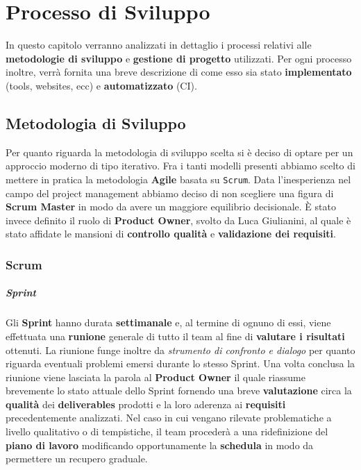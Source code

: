 \chapter{Processo di Sviluppo}
In questo capitolo verranno analizzati in dettaglio i processi relativi alle \textbf{metodologie di sviluppo} e \textbf{gestione di progetto} utilizzati. Per ogni processo inoltre, verrà fornita una breve descrizione di come esso sia stato \textbf{implementato} (tools, websites, ecc) e \textbf{automatizzato} (CI).  
\section{Metodologia di Sviluppo}
Per quanto riguarda la metodologia di sviluppo scelta si è deciso di optare per un approccio moderno di tipo iterativo. Fra i tanti modelli presenti abbiamo scelto di mettere in pratica la metodologia \textbf{Agile} basata su \texttt{Scrum}. Data l'inesperienza nel campo del project management abbiamo deciso di non scegliere una figura di \textbf{Scrum Master} in modo da avere un maggiore equilibrio decisionale. È stato invece definito il ruolo di \textbf{Product Owner}, svolto da Luca Giulianini, al quale è stato affidate le mansioni di \textbf{controllo qualità} e \textbf{validazione dei requisiti}.
\subsection{Scrum}
\label{subsec:scrum}
	\paragraph{Sprint} %
	\label{par:sprint}
	Gli \textbf{Sprint} hanno durata \textbf{settimanale} e, al termine di ognuno di essi, viene effettuata una \textbf{runione} generale di tutto il team al fine di \textbf{valutare i risultati} ottenuti. La riunione funge inoltre da \textit{strumento di confronto e dialogo} per quanto riguarda eventuali problemi emersi durante lo stesso Sprint. Una volta conclusa la riunione viene lasciata la parola al \textbf{Product Owner} il quale riassume brevemente lo stato attuale dello Sprint fornendo una breve \textbf{valutazione} circa la \textbf{qualità} dei \textbf{deliverables} prodotti e la loro aderenza ai \textbf{requisiti} precedentemente analizzati. Nel caso in cui vengano rilevate problematiche a livello qualitativo o di tempistiche, il team procederà a una ridefinizione del \textbf{piano di lavoro} modificando opportunamente la \textbf{schedula} in modo da permettere un recupero graduale.

